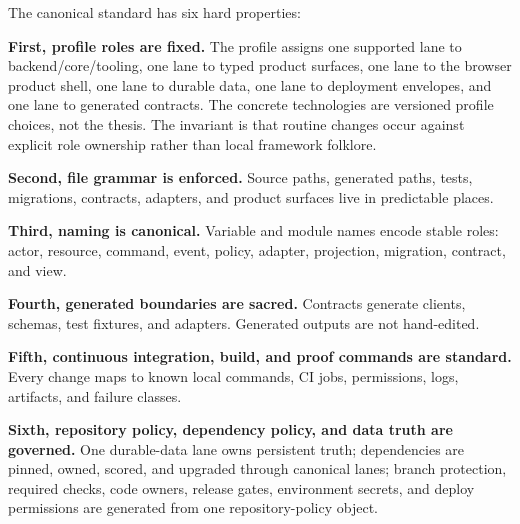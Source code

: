 The canonical standard has six hard properties:

\textbf{First, profile roles are fixed.} The profile assigns one supported lane to backend/core/tooling, one lane to typed product surfaces, one lane to the browser product shell, one lane to durable data, one lane to deployment envelopes, and one lane to generated contracts. The concrete technologies are versioned profile choices, not the thesis. The invariant is that routine changes occur against explicit role ownership rather than local framework folklore.

\textbf{Second, file grammar is enforced.} Source paths, generated paths, tests, migrations, contracts, adapters, and product surfaces live in predictable places.

\textbf{Third, naming is canonical.} Variable and module names encode stable roles: actor, resource, command, event, policy, adapter, projection, migration, contract, and view.

\textbf{Fourth, generated boundaries are sacred.} Contracts generate clients, schemas, test fixtures, and adapters. Generated outputs are not hand-edited.

\textbf{Fifth, continuous integration, build, and proof commands are standard.} Every change maps to known local commands, CI jobs, permissions, logs, artifacts, and failure classes.

\textbf{Sixth, repository policy, dependency policy, and data truth are governed.} One durable-data lane owns persistent truth; dependencies are pinned, owned, scored, and upgraded through canonical lanes; branch protection, required checks, code owners, release gates, environment secrets, and deploy permissions are generated from one repository-policy object.

